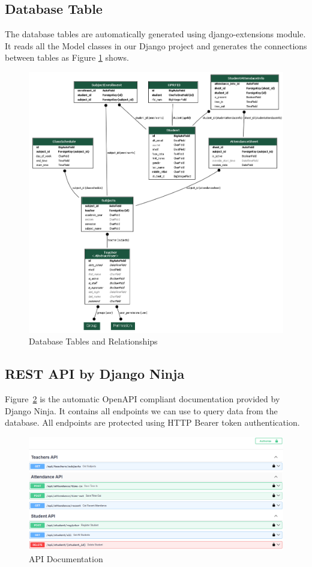 \subsection{Database Table}
The database tables are automatically generated using django-extensions module. It reads all the Model classes in our Django project and generates the connections between tables as Figure \ref{fig:db_tables} shows.
\begin{figure}[h] %
	\centering
	\includegraphics[width=1\textwidth]{figures/chapter4/auto_erd.png} %
	\caption{Database Tables and Relationships}
	\label{fig:db_tables}
\end{figure}	

\subsection{REST API by Django Ninja}
Figure~\ref{fig:api} is the automatic OpenAPI compliant documentation provided by Django Ninja. It contains all endpoints we can use to query data from the database. All endpoints are protected using HTTP Bearer token authentication.
\begin{figure}[h] %
	\centering
	\includegraphics[width=1\textwidth]{figures/chapter4/api.png} %
	\caption{API Documentation}
	\label{fig:api}
\end{figure}

